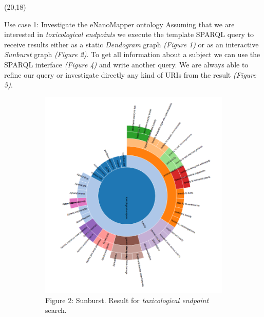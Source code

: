 \documentclass[final]{beamer}
\begin{document}
\begin{frame}{}
    \begin{textblock}{62}(20,18)
      \justifying
      \begin{block}{Use case 1: Investigate the eNanoMapper ontology}
        Assuming that we are interested in \emph{toxicological endpoints} we execute the template SPARQL query to receive results either as a static \emph{Dendogram} graph \emph{(Figure 1)} or as an interactive \emph{Sunburst} graph \emph{(Figure 2)}. To get all information about a subject we can use the SPARQL interface \emph{(Figure 4)} and write another query. We are always able to refine our query or investigate directly any kind of URIs from the result \emph{(Figure 5)}.
        \begin{figure}
          \hspace{-0.1\textwidth}
          \begin{subfigure}[c]{0.35\textwidth}
            \includegraphics[scale=0.75,keepaspectratio]{onto-use-case-1a.png}
            \caption{Figure 2: Sunburst. Result for \emph{toxicological endpoint} search.}
          \end{subfigure}
          \hspace{0.15\textwidth}
          \begin{subfigure}[c]{0.35\textwidth}

\end{subfigure}
\end{figure}
\end{block}
\end{textblock}
\end{frame}
\end{document}
